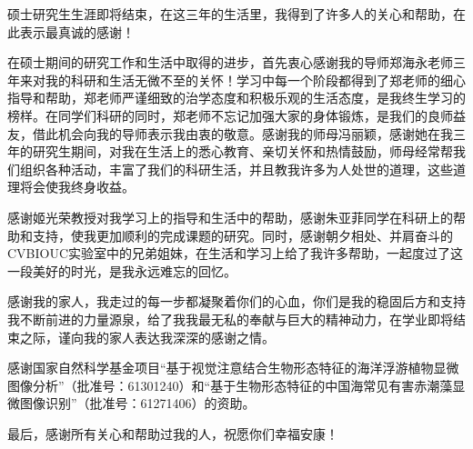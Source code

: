 
\begin{ack}
硕士研究生生涯即将结束，在这三年的生活里，我得到了许多人的关心和帮助，在此表示最真诚的感谢！

在硕士期间的研究工作和生活中取得的进步，首先衷心感谢我的导师郑海永老师三年来对我的科研和生活无微不至的关怀！学习中每一个阶段都得到了郑老师的细心指导和帮助，郑老师严谨细致的治学态度和积极乐观的生活态度，是我终生学习的榜样。在同学们科研的同时，郑老师不忘记加强大家的身体锻炼，是我们的良师益友，借此机会向我的导师表示我由衷的敬意。感谢我的师母冯丽颖，感谢她在我三年的研究生期间，对我在生活上的悉心教育、亲切关怀和热情鼓励，师母经常帮我们组织各种活动，丰富了我们的科研生活，并且教我许多为人处世的道理，这些道理将会使我终身收益。

感谢姬光荣教授对我学习上的指导和生活中的帮助，感谢朱亚菲同学在科研上的帮助和支持，使我更加顺利的完成课题的研究。同时，感谢朝夕相处、并肩奋斗的CVBIOUC实验室中的兄弟姐妹，在生活和学习上给了我许多帮助，一起度过了这一段美好的时光，是我永远难忘的回忆。

感谢我的家人，我走过的每一步都凝聚着你们的心血，你们是我的稳固后方和支持我不断前进的力量源泉，给了我我最无私的奉献与巨大的精神动力，在学业即将结束之际，谨向我的家人表达我深深的感谢之情。

感谢国家自然科学基金项目“基于视觉注意结合生物形态特征的海洋浮游植物显微图像分析”（批准号：61301240）和“基于生物形态特征的中国海常见有害赤潮藻显微图像识别”（批准号：61271406）的资助。

最后，感谢所有关心和帮助过我的人，祝愿你们幸福安康！
\end{ack}

